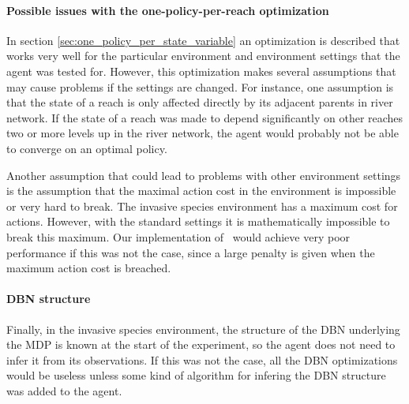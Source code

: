 \paragraph{Possible issues with the one-policy-per-reach optimization} In section \ref{sec:one_policy_per_state_variable} an optimization is described that works very well for the particular environment and environment settings that the agent was tested for. However, this optimization makes several assumptions that may cause problems if the settings are changed. For instance, one assumption is that the state of a reach is only affected directly by its adjacent parents in river network. If the state of a reach was made to depend significantly on other reaches two or more levels up in the river network, the agent would probably not be able to converge on an optimal policy. 

Another assumption that could lead to problems with other environment settings is the assumption that the maximal action cost in the environment is impossible or very hard to break. The invasive species environment has a maximum cost for actions. However, with the standard settings it is mathematically impossible to break this maximum. Our implementation of \etre\ would achieve very poor performance if this was not the case, since a large penalty is given when the maximum action cost is breached. 

\paragraph{DBN structure} Finally, in the invasive species environment, the structure of the DBN underlying the MDP is known at the start of the experiment, so the agent does not need to infer it from its observations. If this was not the case, all the DBN optimizations would be useless unless some kind of algorithm for infering the DBN structure was added to the agent. 
